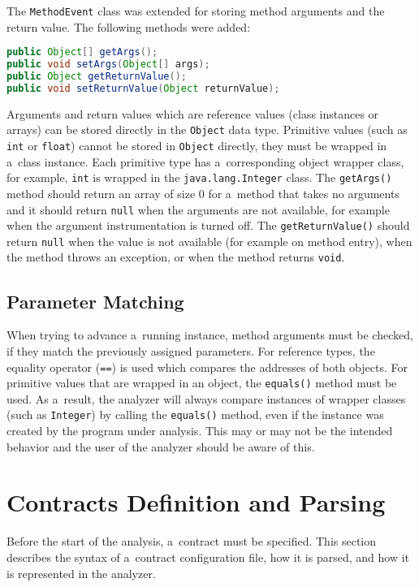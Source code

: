 The \texttt{MethodEvent} class was extended for storing method arguments and the
return value. The following methods were added:

\begin{lstlisting}[language=java]
public Object[] getArgs();
public void setArgs(Object[] args);
public Object getReturnValue();
public void setReturnValue(Object returnValue);
\end{lstlisting}

Arguments and return values which are reference values (class instances or
arrays) can be stored directly in the \texttt{Object} data type. Primitive
values (such as \texttt{int} or \texttt{float}) cannot be stored in
\texttt{Object} directly, they must be wrapped in a~class instance. Each
primitive type has a~corresponding object wrapper class, for example,
\texttt{int} is wrapped in the \texttt{java.lang.Integer} class. The
\texttt{getArgs()} method should return an array of size 0 for a~method that
takes no arguments and it should return \texttt{null} when the arguments are not
available, for example when the argument instrumentation is turned off. The
\texttt{getReturnValue()} should return \texttt{null} when the value is not
available (for example on method entry), when the method throws an exception, or
when the method returns \texttt{void}.

\subsection{Parameter Matching}
When trying to advance a~running instance, method arguments must be checked, if
they match the previously assigned parameters. For reference types, the equality
operator (\texttt{==}) is used which compares the addresses of both objects. For
primitive values that are wrapped in an object, the \texttt{equals()} method
must be used. As a~result, the analyzer will always compare instances of wrapper
classes (such as \texttt{Integer}) by calling the \texttt{equals()} method, even
if the instance was created by the program under analysis. This may or may not
be the intended behavior and the user of the analyzer should be aware of this.

\section{Contracts Definition and Parsing}
\label{contracts}

Before the start of the analysis, a~contract must be specified. This section
describes the syntax of a~contract configuration file, how it is parsed, and how
it is represented in the analyzer.

